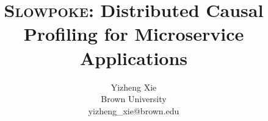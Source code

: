 \documentclass[letterpaper,twocolumn,10pt]{article}
\newcommand{\ours}{\textsc{Slowpoke}\xspace}
\begin{document}
\title{\ours: Distributed Causal Profiling for Microservice Applications}
\author{Yizheng Xie\\ Brown University \\ {yizheng\_xie@brown.edu}}
\maketitle










% 
% 
% 
% 
% 
% 
% 
% 
%






%
\end{document}
